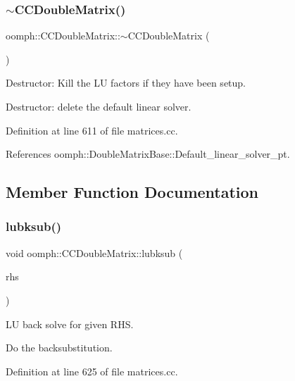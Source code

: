 \subsubsection{\texorpdfstring{$\sim$\+C\+C\+Double\+Matrix()}{~CCDoubleMatrix()}}
{\footnotesize\ttfamily oomph\+::\+C\+C\+Double\+Matrix\+::$\sim$\+C\+C\+Double\+Matrix (\begin{DoxyParamCaption}{ }\end{DoxyParamCaption})\hspace{0.3cm}{\ttfamily [virtual]}}



Destructor\+: Kill the LU factors if they have been setup. 

Destructor\+: delete the default linear solver. 

Definition at line 611 of file matrices.\+cc.



References oomph\+::\+Double\+Matrix\+Base\+::\+Default\+\_\+linear\+\_\+solver\+\_\+pt.



\subsection{Member Function Documentation}
\mbox{\label{classoomph_1_1CCDoubleMatrix_a59fbc30e6a856794cd2678856c8aea6d}} 
\subsubsection{\texorpdfstring{lubksub()}{lubksub()}}
{\footnotesize\ttfamily void oomph\+::\+C\+C\+Double\+Matrix\+::lubksub (\begin{DoxyParamCaption}\item[{\hyperlink{classoomph_1_1DoubleVector}{Double\+Vector} \&}]{rhs }\end{DoxyParamCaption})\hspace{0.3cm}{\ttfamily [virtual]}}



LU back solve for given R\+HS. 

Do the backsubstitution. 

Definition at line 625 of file matrices.\+cc.



